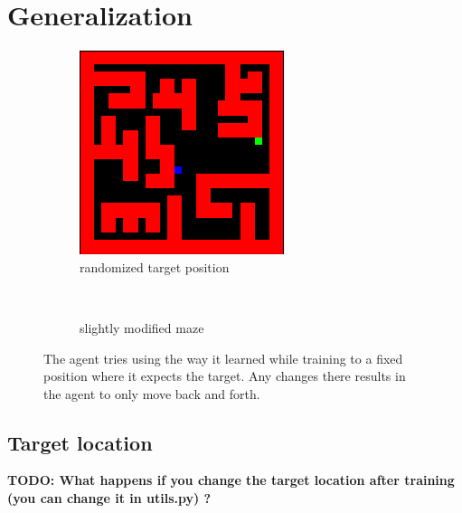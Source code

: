 \documentclass[a4paper,14pt]{article}
\begin{document}
\section{Generalization}\label{sec:generalization}

\begin{figure}
    \centering
    \begin{subfigure}[b]{0.3\textwidth}
        \includegraphics[width=\textwidth]{random_target}
        \caption{randomized target position}
        \label{fig:randomtargetmaze}
    \end{subfigure}
    ~ %
    \begin{subfigure}[b]{0.3\textwidth}
        \caption{slightly modified maze}
        \label{fig:othermaze}
    \end{subfigure}
    \caption{The agent tries using the way it learned while training to a fixed
      position where it expects the target. Any changes there results in
      the agent to only move back and forth.}\label{fig:generalization}
\end{figure}

\subsection{Target location}
\textbf{TODO: What happens if you change the target location after training (you can
change it in utils.py) ?}
\end{document}
